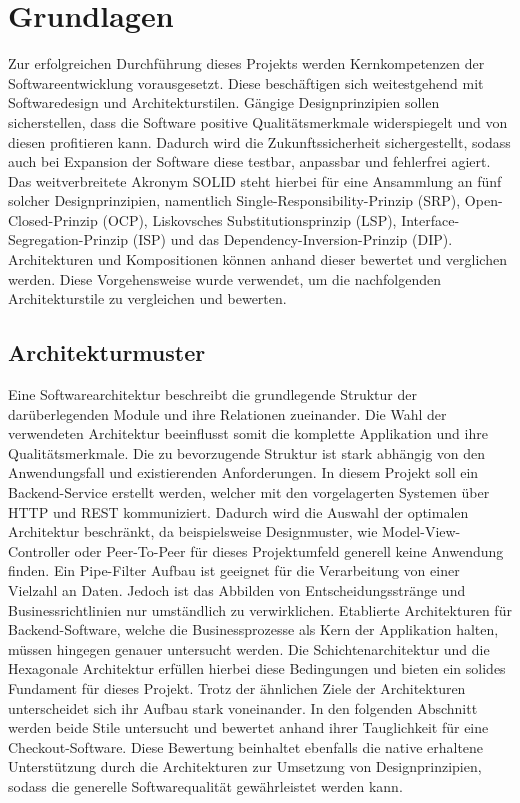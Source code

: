 

\chapter{Grundlagen}


Zur erfolgreichen Durchführung dieses Projekts werden Kernkompetenzen der Softwareentwicklung vorausgesetzt. Diese beschäftigen sich weitestgehend mit Softwaredesign und Architekturstilen. Gängige Designprinzipien sollen sicherstellen, dass die Software positive Qualitätsmerkmale widerspiegelt und von diesen profitieren kann. Dadurch wird die Zukunftssicherheit sichergestellt, sodass auch bei Expansion der Software diese testbar, anpassbar und fehlerfrei agiert. Das weitverbreitete Akronym SOLID steht hierbei für eine Ansammlung an fünf solcher Designprinzipien, namentlich Single-Responsibility-Prinzip (SRP), Open-Closed-Prinzip (OCP), Liskovsches Substitutionsprinzip (LSP), Interface-Segregation-Prinzip (ISP) und das Dependency-Inversion-Prinzip (DIP). Architekturen und Kompositionen können anhand dieser bewertet und verglichen werden. Diese Vorgehensweise wurde verwendet, um die nachfolgenden Architekturstile zu vergleichen und bewerten. 

\section{Architekturmuster}


Eine Softwarearchitektur beschreibt die grundlegende Struktur der darüberlegenden Module und ihre Relationen zueinander. Die Wahl der verwendeten Architektur beeinflusst somit die komplette Applikation und ihre Qualitätsmerkmale. Die zu bevorzugende Struktur ist stark abhängig von den Anwendungsfall und existierenden Anforderungen. In diesem Projekt soll ein Backend-Service erstellt werden, welcher mit den vorgelagerten Systemen über HTTP und REST kommuniziert. Dadurch wird die Auswahl der optimalen Architektur beschränkt, da beispielsweise Designmuster, wie Model-View-Controller oder Peer-To-Peer für dieses Projektumfeld generell keine Anwendung finden.  Ein Pipe-Filter Aufbau ist geeignet für die Verarbeitung von einer Vielzahl an Daten. Jedoch ist das Abbilden von Entscheidungsstränge und Businessrichtlinien nur umständlich zu verwirklichen. Etablierte Architekturen für Backend-Software, welche die Businessprozesse als Kern der Applikation halten, müssen hingegen genauer untersucht werden. Die Schichtenarchitektur und die Hexagonale Architektur erfüllen hierbei diese Bedingungen und bieten ein solides Fundament für dieses Projekt. Trotz der ähnlichen Ziele der Architekturen unterscheidet sich ihr Aufbau stark voneinander. In den folgenden Abschnitt werden beide Stile untersucht und bewertet anhand ihrer Tauglichkeit für eine Checkout-Software. Diese Bewertung beinhaltet ebenfalls die native erhaltene Unterstützung durch die Architekturen zur Umsetzung von Designprinzipien, sodass die generelle Softwarequalität gewährleistet werden kann. 

